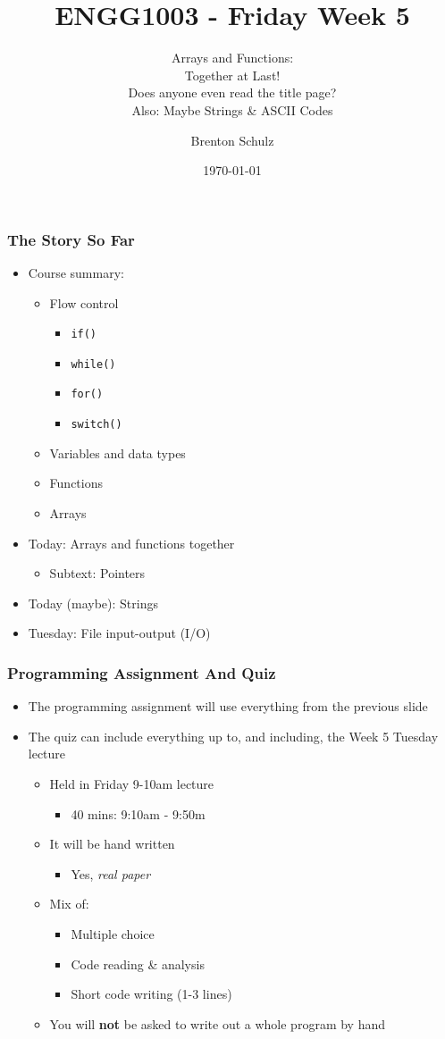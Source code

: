 \documentclass[14pt]{beamer}
\title{ENGG1003 - Friday Week 5}
\subtitle{Arrays and Functions:\\Together at Last!\\{\tiny{Does anyone even read the title page?}}\\Also: Maybe Strings \& ASCII Codes}
\author{Brenton Schulz}
\institute{University of Newcastle}
\date{\today}
\begin{document}
\titlepage

\begin{frame}
\frametitle{The Story So Far}
\begin{itemize}
\item Course summary:
	\begin{itemize}
		\item Flow control
			\begin{itemize}
				\item \texttt{if()}
				\item \texttt{while()}
				\item \texttt{for()}
				\item \texttt{switch()}
			\end{itemize}
		\item Variables and data types
		\item Functions
		\item Arrays
	\end{itemize}
\item Today: Arrays and functions together
	\begin{itemize}
		\item Subtext: Pointers
	\end{itemize}
\item Today (maybe): Strings
\item Tuesday: File input-output (I/O)
\end{itemize}
\end{frame}

\begin{frame}
\frametitle{Programming Assignment And Quiz}
\begin{itemize}
\item The programming assignment will use everything from the previous slide
\item The quiz can include everything up to, and including, the Week 5 Tuesday lecture
	\begin{itemize}
		\item Held in Friday 9-10am lecture
			\begin{itemize}
				\item 40 mins: 9:10am - 9:50m
			\end{itemize}
		\item It will be hand written
			\begin{itemize}
				\item Yes, \textit{real paper}
			\end{itemize}
		\item Mix of:
			\begin{itemize}
				\item Multiple choice
				\item Code reading \& analysis
				\item Short code writing (1-3 lines)
			\end{itemize}
		\item You will \textbf{not} be asked to write out a whole program by hand
	\end{itemize}
\end{itemize}
\end{frame}
\end{document}
